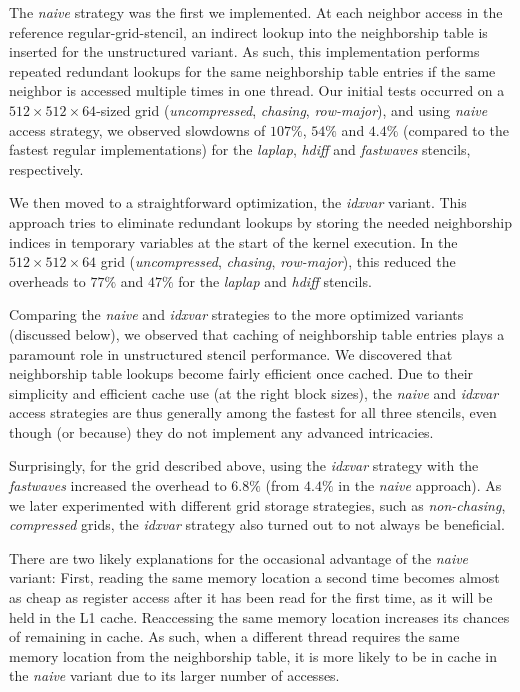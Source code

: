 The \emph{naive} strategy was the first we implemented. At each neighbor access in the reference regular-grid-stencil, an indirect lookup into the neighborship table is inserted for the unstructured variant. As such, this implementation performs repeated redundant lookups for the same neighborship table entries if the same neighbor is accessed multiple times in one thread. Our initial tests occurred on a $512\times 512\times 64$-sized grid (\emph{uncompressed}, \emph{chasing}, \emph{row-major}), and using \emph{naive} access strategy, we observed slowdowns of $107\%$, $54\%$ and $4.4\%$ (compared to the fastest regular implementations) for the \emph{laplap}, \emph{hdiff} and \emph{fastwaves} stencils, respectively.

We then moved to a straightforward optimization, the \emph{idxvar} variant. This approach tries to eliminate redundant lookups by storing the needed neighborship indices in temporary variables at the start of the kernel execution. In the $512\times 512\times 64$ grid (\emph{uncompressed}, \emph{chasing}, \emph{row-major}), this reduced the overheads to $77\%$ and $47\%$ for the \emph{laplap} and \emph{hdiff} stencils.

Comparing the \emph{naive} and \emph{idxvar} strategies to the more optimized variants (discussed below), we observed that caching of neighborship table entries plays a paramount role in unstructured stencil performance. We discovered that neighborship table lookups become fairly efficient once cached. Due to their simplicity and efficient cache use (at the right block sizes), the \emph{naive} and \emph{idxvar} access strategies are thus generally among the fastest for all three stencils, even though (or because) they do not implement any advanced intricacies.

Surprisingly, for the grid described above, using the \emph{idxvar} strategy with the \emph{fastwaves} increased the overhead to $6.8\%$ (from $4.4\%$ in the \emph{naive} approach). As we later experimented with different grid storage strategies, such as \emph{non-chasing}, \emph{compressed} grids, the \emph{idxvar} strategy also turned out to not always be beneficial.

There are two likely explanations for the occasional advantage of the \emph{naive} variant: First, reading the same memory location a second time becomes almost as cheap as register access after it has been read for the first time, as it will be held in the L1 cache. Reaccessing the same memory location increases its chances of remaining in cache. As such, when a different thread requires the same memory location from the neighborship table, it is more likely to be in cache in the \emph{naive} variant due to its larger number of accesses.

